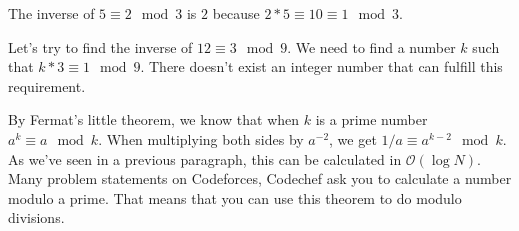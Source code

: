 The inverse of $5 \equiv 2 \mod{3}$ is $2$ because $2*5 \equiv 10 \equiv 1 \mod{3}$.

Let's try to find the inverse of $12 \equiv 3 \mod{9}$. 
We need to find a number $k$ such that $k*3 \equiv 1 \mod{9}$. There doesn't exist an integer number that can fulfill this requirement.

By Fermat's little theorem, we know that when $k$ is a prime number $a^k \equiv a \mod{k}$. When multiplying both sides by $a^{-2}$, we get $1/a \equiv a^{k-2} \mod{k}$. As we've seen in a previous paragraph, this can be calculated in $ \mathcal{O}{\left(\log{N}\right)} $.
Many problem statements on Codeforces, Codechef ask you to calculate a number modulo a prime. That means that you can use this theorem to do modulo divisions.